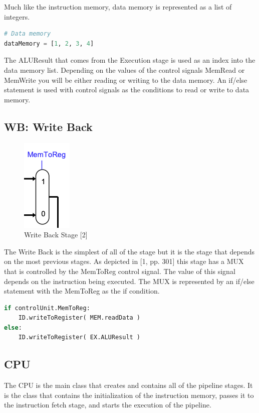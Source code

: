 \documentclass[conference]{IEEEtran}
\begin{document}
Much like the instruction memory, data memory is represented as a list of integers.

\begin{lstlisting}[language=Python]
# Data memory
dataMemory = [1, 2, 3, 4]
\end{lstlisting}

The ALUResult that comes from the Execution stage is used as an index into the data memory list.  Depending on the values of the control signals MemRead or MemWrite you will be either reading or writing to the data memory.  An if/else statement is used with control signals as the conditions to read or write to data memory.

\subsection{WB: Write Back}

\begin{figure}
    \centering
    \includegraphics[scale=.4]{writeback.png}
    \caption{Write Back Stage [2]}
    \label{fig:writeback}
\end{figure}

The Write Back is the simplest of all of the stage but it is the stage that depends on the most previous stages.  As depicted in [1, pp. 301] this stage has a MUX that is controlled by the MemToReg control signal.  The value of this signal depends on the instruction being executed.  The MUX is represented by an if/else statement with the MemToReg as the if condition.

\begin{lstlisting}[language=Python]
if controlUnit.MemToReg:
    ID.writeToRegister( MEM.readData )
else:
    ID.writeToRegister( EX.ALUResult )
\end{lstlisting}

\subsection{CPU}
The CPU is the main class that creates and contains all of the pipeline stages.  It is the class that contains the initialization of the instruction memory, passes it to the instruction fetch stage, and starts the execution of the pipeline.
\end{document}
